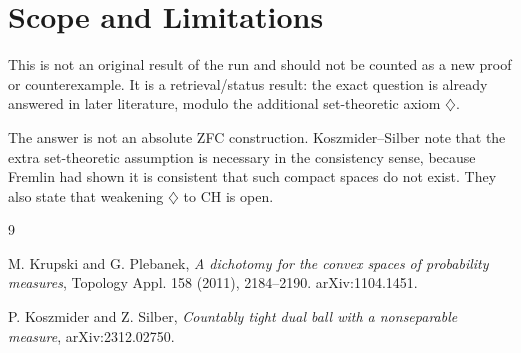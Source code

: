 \documentclass[11pt]{article}
\begin{document}
\section*{Scope and Limitations}

This is not an original result of the run and should not be counted as a
new proof or counterexample. It is a retrieval/status result: the exact
question is already answered in later literature, modulo the additional
set-theoretic axiom \(\diamondsuit\).

The answer is not an absolute ZFC construction. Koszmider--Silber note
that the extra set-theoretic assumption is necessary in the consistency
sense, because Fremlin had shown it is consistent that such compact
spaces do not exist. They also state that weakening \(\diamondsuit\) to
CH is open.

\begin{thebibliography}{9}

M. Krupski and G. Plebanek,
\emph{A dichotomy for the convex spaces of probability measures},
Topology Appl. 158 (2011), 2184--2190.
arXiv:1104.1451.

P. Koszmider and Z. Silber,
\emph{Countably tight dual ball with a nonseparable measure},
arXiv:2312.02750.

\end{thebibliography}
\end{document}
